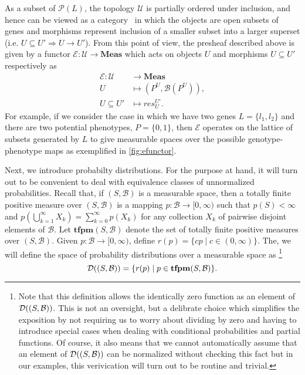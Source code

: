 As a subset of $\mathcal{P}(L)$, the topology $\mathcal{U}$ is partially ordered under inclusion, and hence can be viewed as a category~\cite{Lane1998,MacLane1992,Awodey2006} in which the objects are open subsets of genes and morphisms represent inclusion of a smaller subset into a larger superset (i.e. $U \subseteq U' \Rightarrow U \rightarrow U'$).  From this point of view, the presheaf described above is given by a functor $\mathcal{E} \colon \mathcal{U} \rightarrow \mathbf{Meas}$ which acts on objects $U$ and morphisms $U \subseteq U'$ respectively as
\begin{equation}\label{eq:gpfunctor}
\begin{split}
\mathcal{E} \colon \mathcal{U} &\rightarrow \mathbf{Meas}\\
U &\mapsto (P^U, \mathcal{B}(P^U)),\\
U \subseteq U' &\mapsto res^{U'}_{U}.
\end{split}
\end{equation}
For example, if we consider the case in which we have two genes $L=\{l_1,l_2\}$ and there are two potential phenotypes, $P=\{0,1\}$, then $\mathcal{E}$ operates on the lattice of subsets generated by $L$ to give measurable spaces over the possible genotype-phenotype maps as exemplified in \ref{fig:efunctor}.

Next, we introduce probabilty distributions.  For the purpose at hand, it will turn out to be convenient to deal with equivalence classes of unnormalized probabilities.  Recall that, if $(S,\mathcal{B})$ is a measurable space, then a totally finite positive measure over $(S,\mathcal{B})$ is a mapping $p \colon \mathcal{B} \to [0,\infty)$ such that $p(S) < \infty$ and $p(\bigcup_{k=1}^\infty X_k) = \sum_{k=0}^\infty p(X_k)$ for any collection $X_k$ of pairwise disjoint elements of $\mathcal{B}$.  Let $\mathbf{tfpm}(S,\mathcal{B})$ denote the set of totally finite positive measures over $(S,\mathcal{B})$.  Given $p \colon \mathcal{B} \to [0,\infty)$, define $r(p) = \{cp \mid c \in (0,\infty)\}$.  The, we will define the space of probability distributions over a measurable space as
\footnote{Note that this definition allows the identically zero function as an element of $\mathcal{D}((S,\mathcal{B}))$.  This is not an oversight, but a delibrate choice which simplifies the exposition by not requiring us to worry about dividing by zero and having to introduce special cases when dealing with conditional probabilities and partial functions.  Of course, it also means that we cannot automatically assume that an element of $\mathcal{D}((S,\mathcal{B}))$ can be normalized without checking this fact but in our examples, this verivication will turn out to be routine and trivial.}
\begin{equation}\label{eq:distfunctor} \mathcal{D}((S,\mathcal{B})) = \{r(p) \mid p \in \mathbf{tfpm}(S,\mathcal{B})\} .\end{equation}

